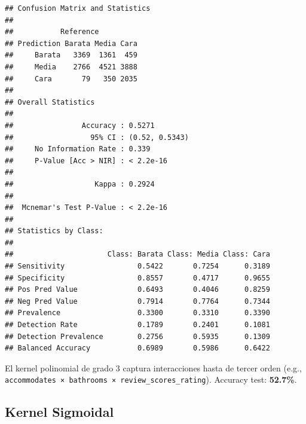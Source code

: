 \documentclass[
]{article}
\begin{document}
\begin{verbatim}
## Confusion Matrix and Statistics
## 
##           Reference
## Prediction Barata Media Cara
##     Barata   3369  1361  459
##     Media    2766  4521 3888
##     Cara       79   350 2035
## 
## Overall Statistics
##                                         
##                Accuracy : 0.5271        
##                  95% CI : (0.52, 0.5343)
##     No Information Rate : 0.339         
##     P-Value [Acc > NIR] : < 2.2e-16     
##                                         
##                   Kappa : 0.2924        
##                                         
##  Mcnemar's Test P-Value : < 2.2e-16     
## 
## Statistics by Class:
## 
##                      Class: Barata Class: Media Class: Cara
## Sensitivity                 0.5422       0.7254      0.3189
## Specificity                 0.8557       0.4717      0.9655
## Pos Pred Value              0.6493       0.4046      0.8259
## Neg Pred Value              0.7914       0.7764      0.7344
## Prevalence                  0.3300       0.3310      0.3390
## Detection Rate              0.1789       0.2401      0.1081
## Detection Prevalence        0.2756       0.5935      0.1309
## Balanced Accuracy           0.6989       0.5986      0.6422
\end{verbatim}

El kernel polinomial de grado 3 captura interacciones hasta de tercer
orden (e.g.,
\texttt{accommodates\ ×\ bathrooms\ ×\ review\_scores\_rating}).
Accuracy test: \textbf{52.7\%}.

\subsection{Kernel Sigmoidal}\label{kernel-sigmoidal}
\end{document}
